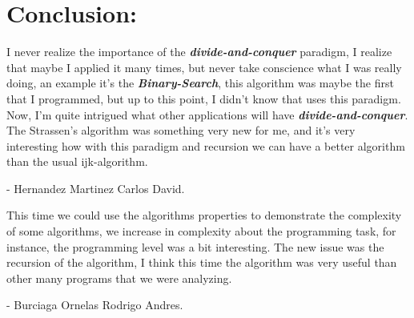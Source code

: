 \section{Conclusion:}

I never realize the importance of the {\bfseries\itshape divide-and-conquer} paradigm, I realize that maybe I applied it many times, but never take conscience what I was really doing, an example it's the {\bfseries\itshape Binary-Search}, this algorithm was maybe the first that I programmed, but up to this point, I didn't know that uses this paradigm. Now, I'm quite intrigued what other applications will have {\bfseries\itshape divide-and-conquer}. The Strassen's algorithm was something very new for me, and it's very interesting how with this paradigm and recursion we can have a better algorithm than the usual ijk-algorithm.

\begin{flushright}
- Hernandez Martinez Carlos David.
\end{flushright} \hfill \break

This time we could use the algorithms properties to demonstrate the complexity of some algorithms, we increase in complexity about the programming task, for instance, the programming level was a bit interesting. The new issue was the recursion of the algorithm, I think this time the algorithm was very useful than other many programs that we were analyzing.

\begin{flushright}
- Burciaga Ornelas Rodrigo Andres.
\end{flushright} 

\pagebreak